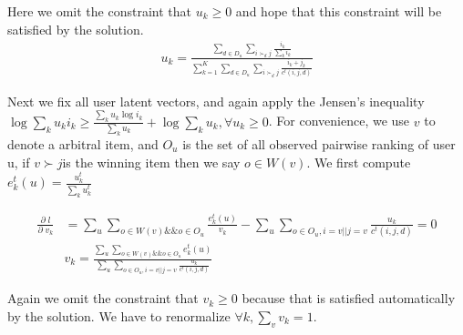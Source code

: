\documentclass{article}
\begin{document}
Here we omit the constraint that $u_k \geq 0$ and hope that this constraint will be satisfied by the solution.
\begin{align}
u_k = \frac{\sum_{d\in D_u} \sum_{i \succ_d j} \frac{i_k}{\sum_k i_k} }{\sum_{k=1}^K \sum_{d\in D_u} \sum_{i \succ_d j}\frac{i_k+j_k}{c^t(i,j,d)}}
\end{align}


Next we fix all user latent vectors, and again apply the Jensen’s inequality $\log \sum_k u_k i_k \geq \frac{\sum_k u_k \log i_k}{\sum_k u_k}+ \log \sum_k u_k,\forall u_k \geq 0$.  For convenience, we use $v$  to denote a arbitral item, and $O_u$  is the set of all observed pairwise ranking of user u, if $ v \succ j $is the winning item then we say $o \in W(v)$.  We first compute $e_k^t(u) = \frac{u_k^t}{\sum_k u_k^t}$

\begin{align}
\frac{\partial \;l}{\partial \;v_k}
 &=\sum_{u} \sum_{o \in W(v) \&\& o \in O_u} \frac{e_k^t(u)}{v_k} - \sum_{u} \sum_{o \in O_u,i=v||j=v} \frac{u_k}{c^t(i, j, d)} =0\\
 & v_k =\frac{\sum_{u} \sum_{o \in W(v) \&\& o \in O_u} e_k^t(u)}{\sum_{u} \sum_{o \in O_u,i=v||j=v} \frac{u_k}{c^t(i, j, d)}}
\end{align}

Again we omit the constraint that $v_k \geq 0$ because that is satisfied automatically by the solution. We have to renormalize $\forall k, \sum_v v_k =1 $.
\end{document}
